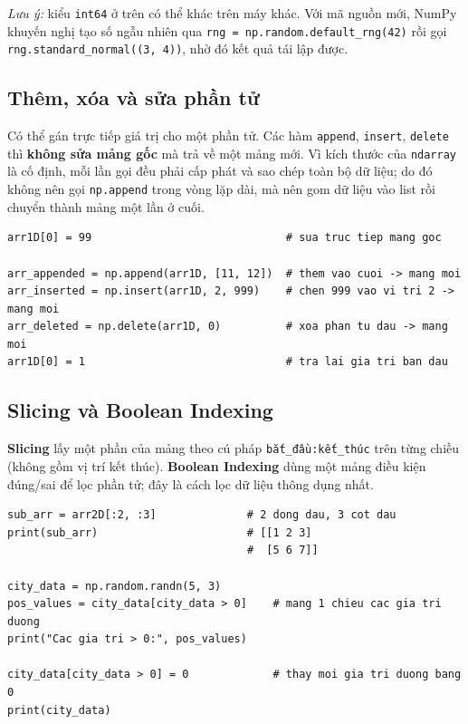 \noindent\textit{Lưu ý:} kiểu \texttt{int64} ở trên có thể khác trên máy khác. Với mã nguồn mới, NumPy khuyến nghị tạo số ngẫu nhiên qua \texttt{rng = np.random.default\_rng(42)} rồi gọi \texttt{rng.standard\_normal((3, 4))}, nhờ đó kết quả tái lập được.

\subsection{Thêm, xóa và sửa phần tử}

Có thể gán trực tiếp giá trị cho một phần tử. Các hàm \texttt{append}, \texttt{insert}, \texttt{delete} thì \textbf{không sửa mảng gốc} mà trả về một mảng mới. Vì kích thước của \texttt{ndarray} là cố định, mỗi lần gọi đều phải cấp phát và sao chép toàn bộ dữ liệu; do đó không nên gọi \texttt{np.append} trong vòng lặp dài, mà nên gom dữ liệu vào list rồi chuyển thành mảng một lần ở cuối.

\begin{lstlisting}[caption={Thêm, xóa và sửa phần tử mảng}]
arr1D[0] = 99                              # sua truc tiep mang goc

arr_appended = np.append(arr1D, [11, 12])  # them vao cuoi -> mang moi
arr_inserted = np.insert(arr1D, 2, 999)    # chen 999 vao vi tri 2 -> mang moi
arr_deleted = np.delete(arr1D, 0)          # xoa phan tu dau -> mang moi
arr1D[0] = 1                               # tra lai gia tri ban dau
\end{lstlisting}

\subsection{Slicing và Boolean Indexing}
\label{sec:boolean-indexing}

\textbf{Slicing} lấy một phần của mảng theo cú pháp \texttt{bắt\_đầu:kết\_thúc} trên từng chiều (không gồm vị trí kết thúc). \textbf{Boolean Indexing} dùng một mảng điều kiện đúng/sai để lọc phần tử; đây là cách lọc dữ liệu thông dụng nhất.

\begin{lstlisting}[caption={Slicing và lọc dữ liệu bằng điều kiện}]
sub_arr = arr2D[:2, :3]              # 2 dong dau, 3 cot dau
print(sub_arr)                       # [[1 2 3]
                                     #  [5 6 7]]

city_data = np.random.randn(5, 3)
pos_values = city_data[city_data > 0]    # mang 1 chieu cac gia tri duong
print("Cac gia tri > 0:", pos_values)

city_data[city_data > 0] = 0             # thay moi gia tri duong bang 0
print(city_data)
\end{lstlisting}

